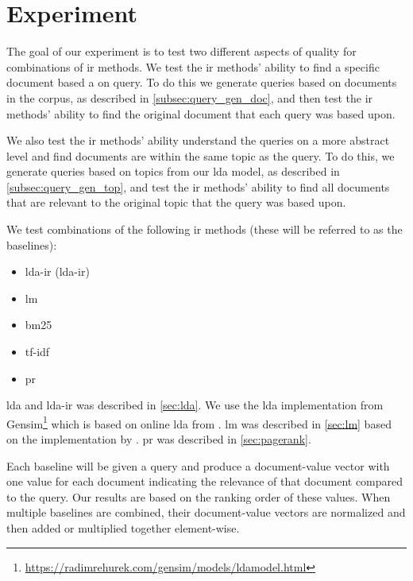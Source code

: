 \section{Experiment}\label{sec:experiment}

The goal of our experiment is to test two different aspects of quality for combinations of \gls{ir} methods.
We test the \gls{ir} methods' ability to find a specific document based a on query.
To do this we generate queries based on documents in the corpus, as described in \autoref{subsec:query_gen_doc}, and then test the \gls{ir} methods' ability to find the original document that each query was based upon.

We also test the \gls{ir} methods' ability understand the queries on a more abstract level and find documents are within the same topic as the query.
To do this, we generate queries based on topics from our \gls{lda} model, as described in \autoref{subsec:query_gen_top}, and test the \gls{ir} methods' ability to find all documents that are relevant to the original topic that the query was based upon.

We test combinations of the following \gls{ir} methods (these will be referred to as the baselines):
\begin{itemize}
	\item \Acrlong{lda}-\acrlong{ir} (\acrshort{lda}-\acrshort{ir})
	\item \acrfull{lm}
	\item \acrfull{bm25}
	\item \acrfull{tf-idf}
	\item \acrfull{pr}
\end{itemize}

\gls{lda} and \gls{lda}-\gls{ir} was described in \autoref{sec:lda}.
We use the \gls{lda} implementation from Gensim\footnote{\url{https://radimrehurek.com/gensim/models/ldamodel.html}} which is based on online \gls{lda} from \citet{blei2010online}.
\gls{lm} was described in \autoref{sec:lm} based on the implementation by \citet{yang2009topic}.
\gls{pr} was described in \autoref{sec:pagerank}.



Each baseline will be given a query and produce a document-value vector with one value for each document indicating the relevance of that document compared to the query.
Our results are based on the ranking order of these values.
When multiple baselines are combined, their document-value vectors are normalized and then added or multiplied together element-wise.

